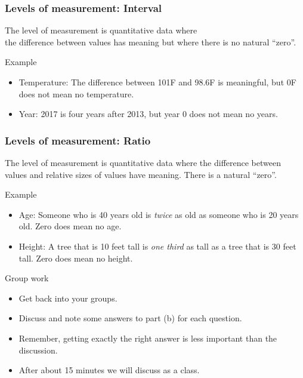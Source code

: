 \documentclass[xcolor=table]{beamer}
\begin{document}
\begin{frame}
\frametitle{Levels of measurement: Interval}
\begin{block}{}
\large The  level of measurement is quantitative data where\\ the difference between values has meaning but where there is no natural ``zero''.
\end{block}
\pause
\begin{exampleblock}{Example}
\begin{itemize}
\item Temperature: The difference between 101\textdegree F and 98.6\textdegree F is meaningful, but 0\textdegree F does not mean no temperature.
\item Year: 2017 is four years after 2013, but year 0 does not mean no years.
\end{itemize}
\end{exampleblock}
\end{frame}

\begin{frame}
\frametitle{Levels of measurement: Ratio}
\begin{block}{}
\large The  level of measurement is quantitative data where the difference between values and relative sizes of values have meaning. There is a natural ``zero''.
\end{block}
\pause
\begin{exampleblock}{Example}
\begin{itemize}
\item Age: Someone who is 40 years old is \emph{twice} as old as someone who is 20 years old. Zero does mean no age.

\item Height: A tree that is 10 feet tall is \emph{one third} as tall as a tree that is 30 feet tall. Zero does mean no height.
\end{itemize}

\end{exampleblock}
\end{frame}

\begin{frame}{Group work}
\begin{block}{}
\large
\begin{itemize}
\item Get back into your groups.
\item Discuss and note some answers to part (b) for each question.
\item Remember, getting exactly the right answer is less important than the discussion.
\item After about 15 minutes we will discuss as a class. 
\end{itemize}
\end{block}
\end{frame}
\end{document}

